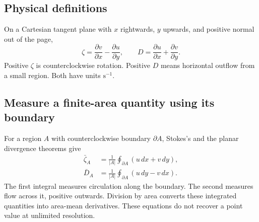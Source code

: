\documentclass[11pt]{article}
\newcommand{\sone}{\mathrm{s^{-1}}}
\begin{document}
\subsection{Physical definitions}

On a Cartesian tangent plane with $x$ rightwards, $y$ upwards, and positive
normal out of the page,
\begin{equation}\label{eq:derivatives}
 \zeta=\frac{\partial v}{\partial x}-\frac{\partial u}{\partial y},
 \qquad
 D=\frac{\partial u}{\partial x}+\frac{\partial v}{\partial y}.
\end{equation}
Positive $\zeta$ is counterclockwise rotation. Positive $D$ means horizontal
outflow from a small region. Both have units $\sone$.

\subsection{Measure a finite-area quantity using its boundary}

For a region $A$ with counterclockwise boundary $\partial A$, Stokes's and
the planar divergence theorems give
\begin{align}
 \bar\zeta_A&=\frac{1}{|A|}\oint_{\partial A}(u\,dx+v\,dy),
 \label{eq:curlcontour}\\
 \bar D_A&=\frac{1}{|A|}\oint_{\partial A}(u\,dy-v\,dx).
 \label{eq:divcontour}
\end{align}
The first integral measures circulation along the boundary. The second
measures flow across it, positive outwards. Division by area converts these
integrated quantities into area-mean derivatives. These equations do not
recover a point value at unlimited resolution.

\begin{center}
\end{center}
\end{document}
